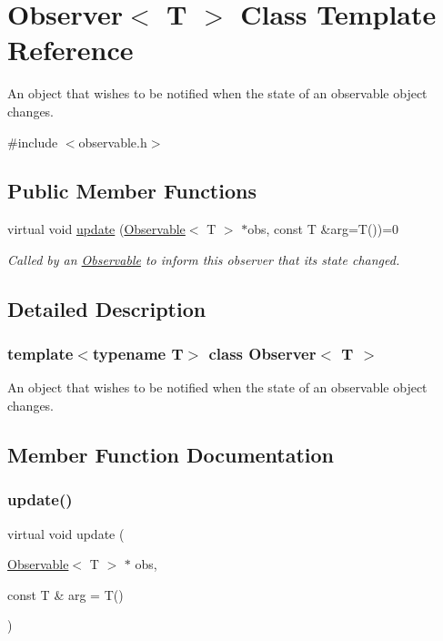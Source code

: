 \hypertarget{classObserver}{}\section{Observer$<$ T $>$ Class Template Reference}
\label{classObserver}


An object that wishes to be notified when the state of an observable object changes.  




{\ttfamily \#include $<$observable.\+h$>$}

\subsection*{Public Member Functions}
\begin{DoxyCompactItemize}
\item 
virtual void \mbox{\hyperlink{classObserver_a8800f4bd3e48ece6f15db487ebad3712}{update}} (\mbox{\hyperlink{classObservable}{Observable}}$<$ T $>$ $\ast$obs, const T \&arg=T())=0
\begin{DoxyCompactList}\small\item\em Called by an \mbox{\hyperlink{classObservable}{Observable}} to inform this observer that its state changed. \end{DoxyCompactList}\end{DoxyCompactItemize}


\subsection{Detailed Description}
\subsubsection*{template$<$typename T$>$\newline
class Observer$<$ T $>$}

An object that wishes to be notified when the state of an observable object changes. 

\subsection{Member Function Documentation}
\mbox{\label{classObserver_a8800f4bd3e48ece6f15db487ebad3712}} 
\subsubsection{\texorpdfstring{update()}{update()}}
{\footnotesize\ttfamily virtual void update (\begin{DoxyParamCaption}\item[{\mbox{\hyperlink{classObservable}{Observable}}$<$ T $>$ $\ast$}]{obs,  }\item[{const T \&}]{arg = {\ttfamily T()} }\end{DoxyParamCaption})\hspace{0.3cm}{\ttfamily [pure virtual]}}



